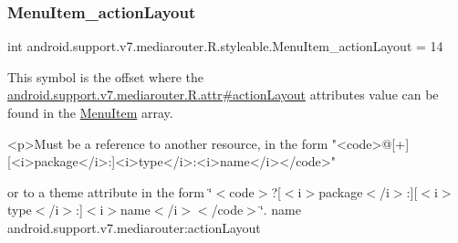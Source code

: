 \mbox{\label{classandroid_1_1support_1_1v7_1_1mediarouter_1_1R_1_1styleable_a78482ce9b7b1a984cf7dcd025dda397f}} 
\subsubsection{\texorpdfstring{Menu\+Item\+\_\+action\+Layout}{MenuItem\_actionLayout}}
{\footnotesize\ttfamily int android.\+support.\+v7.\+mediarouter.\+R.\+styleable.\+Menu\+Item\+\_\+action\+Layout = 14\hspace{0.3cm}{\ttfamily [static]}}

This symbol is the offset where the \hyperlink{classandroid_1_1support_1_1v7_1_1mediarouter_1_1R_1_1attr_a8c4b337670729c8165afc211a5afc59a}{android.\+support.\+v7.\+mediarouter.\+R.\+attr\#action\+Layout} attribute\textquotesingle{}s value can be found in the \hyperlink{classandroid_1_1support_1_1v7_1_1mediarouter_1_1R_1_1styleable_ab3f2d4af0d17a47efacf7fd82df9528d}{Menu\+Item} array.

\begin{DoxyVerb}      <p>Must be a reference to another resource, in the form "<code>@[+][<i>package</i>:]<i>type</i>:<i>name</i></code>"
\end{DoxyVerb}
 or to a theme attribute in the form \char`\"{}$<$code$>$?\mbox{[}$<$i$>$package$<$/i$>$\+:\mbox{]}\mbox{[}$<$i$>$type$<$/i$>$\+:\mbox{]}$<$i$>$name$<$/i$>$$<$/code$>$\char`\"{}.  name android.\+support.\+v7.\+mediarouter\+:action\+Layout \mbox{\label{classandroid_1_1support_1_1v7_1_1mediarouter_1_1R_1_1styleable_ae72dd8fd6d8d6b80d2966548a77910e2}} 
